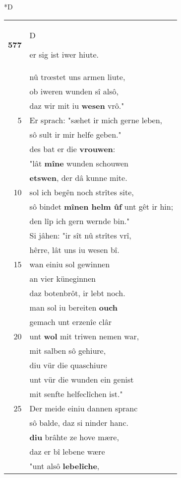 \documentclass[8pt,a4paper,notitlepage]{article}
\begin{document}
\begin{table}[ht]
\begin{minipage}[t]{0.5\linewidth}
\small
\begin{center}*D
\end{center}
\begin{tabular}{rl}
\textbf{577} & \begin{large}D\end{large}er sig ist iwer hiute.\\ 
 & nû trœstet uns armen liute,\\ 
 & ob iweren wunden sî alsô,\\ 
 & daz wir mit iu \textbf{wesen} vrô."\\ 
5 & Er sprach: "sæhet ir mich gerne leben,\\ 
 & sô sult ir mir helfe geben."\\ 
 & des bat er die \textbf{vrouwen}:\\ 
 & "lât \textbf{mîne} wunden schouwen\\ 
 & \textbf{etswen}, der dâ kunne mite.\\ 
10 & sol ich begên noch strîtes site,\\ 
 & sô bindet \textbf{mînen helm ûf} unt gêt ir hin;\\ 
 & den lîp ich gern wernde bin."\\ 
 & Si jâhen: "ir sît nû strîtes vrî,\\ 
 & hêrre, lât uns iu wesen bî.\\ 
15 & wan einiu sol gewinnen\\ 
 & an vier küneginnen\\ 
 & daz botenbrôt, ir lebt noch.\\ 
 & man sol iu bereiten \textbf{ouch}\\ 
 & gemach unt erzenîe clâr\\ 
20 & unt \textbf{wol} mit triwen nemen war,\\ 
 & mit salben sô gehiure,\\ 
 & diu vür die quaschiure\\ 
 & unt vür die wunden ein genist\\ 
 & mit senfte helfeclîchen ist."\\ 
25 & Der meide einiu dannen spranc\\ 
 & sô balde, daz si ninder hanc.\\ 
 & \textbf{diu} brâhte ze hove mære,\\ 
 & daz er bî lebene wære\\ 
 & "unt alsô \textbf{lebelîche},\\ 

\end{tabular}
\end{minipage}
\end{table}
\end{document}

